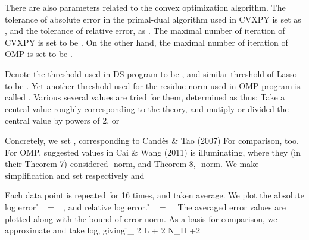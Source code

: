 There are also parameters related to the convex optimization algorithm.
The tolerance of absolute error in the primal-dual algorithm used in CVXPY is set as , and the tolerance of relative error, as .
The maximal number of iteration of CVXPY is set to be .
On the other hand, the maximal number of iteration of OMP is set to be .

Denote the threshold used in DS program to be , and similar threshold of Lasso to be .
Yet another threshold used for the residue norm used in OMP program is called \m {\eta}.
Various several values are tried for them, determined as thus: Take a central value roughly corresponding to the theory, and mutiply or divided the central value by powers of 2, or 

Concretely, we set , corresponding to Cand\`es \& Tao (2007)
For comparison,  too.
For OMP, suggested values in Cai \& Wang (2011) is illuminating, where they (in their Theorem 7) considered -norm, and Theorem 8, \m {\ell _\infty}-norm.
We make simplification and set respectively  and 

Each data point is repeated for 16 times, and taken average.
We plot the absolute log error
%
 {
\NC \h_{}
=\NC {} _{}, \NR
}
%
and relative log error.
%
 {
\NC \h_{}
=\NC {}
{ _{}} \NR
}
%
The averaged error values are plotted along with the bound of error norm.
As a basis for comparison, we approximate  and take log, giving
%
 {
\NC \h_{}
\eqsim \NC {} {2} \log L + {2} \log \log N_H +2 \NR
}



\page [yes]

\startsubsection [title={Plots for \m {N_H=16}}]

\stopsubsection

\startsubsection [title={Plots for \m {N_H=32}}]

\blank [big]

\blank [big]

\blank [big]

